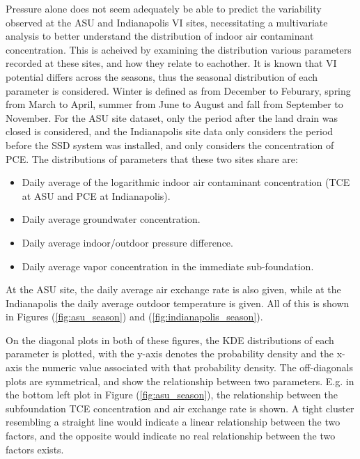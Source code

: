 \documentclass[journal=esthag,manuscript=article]{achemso}
\begin{document}
Pressure alone does not seem adequately be able to predict the variability observed at the ASU and Indianapolis VI sites, necessitating a multivariate analysis to better understand the distribution of indoor air contaminant concentration.
This is acheived by examining the distribution various parameters recorded at these sites, and how they relate to eachother.
It is known that VI potential differs across the seasons, thus the seasonal distribution of each parameter is considered.
Winter is defined as from December to Feburary, spring from March to April, summer from June to August and fall from September to November.
For the ASU site dataset, only the period after the land drain was closed is considered, and the Indianapolis site data only considers the period before the SSD system was installed, and only considers the concentration of PCE.
The distributions of parameters that these two sites share are:
\begin{itemize}
  \item Daily average of the logarithmic indoor air contaminant concentration (TCE at ASU and PCE at Indianapolis).
  \item Daily average groundwater concentration.
  \item Daily average indoor/outdoor pressure difference.
  \item Daily average vapor concentration in the immediate sub-foundation.
\end{itemize}
At the ASU site, the daily average air exchange rate is also given, while at the Indianapolis the daily average outdoor temperature is given.
All of this is shown in Figures (\ref{fig:asu_season}) and (\ref{fig:indianapolis_season}). \par

On the diagonal plots in both of these figures, the KDE distributions of each parameter is plotted, with the y-axis denotes the probability density and the x-axis the numeric value associated with that probability density.
The off-diagonals plots are symmetrical, and show the relationship between two parameters.
E.g. in the bottom left plot in Figure (\ref{fig:asu_season}), the relationship between the subfoundation TCE concentration and air exchange rate is shown.
A tight cluster resembling a straight line would indicate a linear relationship between the two factors, and the opposite would indicate no real relationship between the two factors exists. \par
\end{document}
